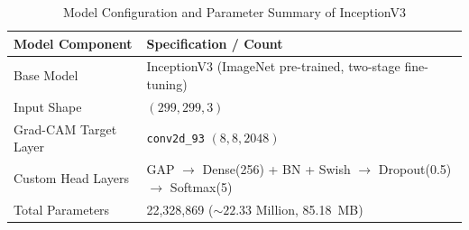 \begin{table}[htbp]
\caption{Model Configuration and Parameter Summary of InceptionV3}
\label{tab:mobilenet_params}
\begin{center}
\begin{tabularx}{\textwidth}{| p{4.5cm} | X |}
\hline
\textbf{Model Component} & \textbf{Specification / Count} \\
\hline
Base Model & InceptionV3 (ImageNet pre-trained, two-stage fine-tuning) \\
\hline
Input Shape & $(299, 299, 3)$ \\
\hline
Grad-CAM Target Layer & \texttt{conv2d\_93} $(8, 8, 2048)$ \\
\hline
Custom Head Layers & GAP $\rightarrow$ Dense(256) + BN + Swish $\rightarrow$ Dropout(0.5) $\rightarrow$ Softmax(5) \\
\hline
Total Parameters & 22,328,869 ($\sim 22.33$ Million, 85.18~MB) \\
\hline
\end{tabularx}
\end{center}
\end{table}

